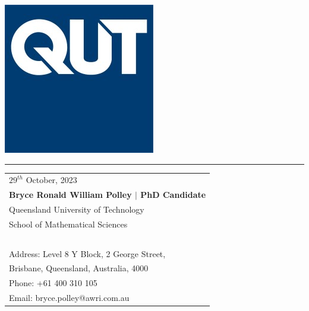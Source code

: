 \documentclass{article}
\begin{document}

\includegraphics[scale=0.5]{logo.jpg} %

\vspace{-1em} %

\rule{\linewidth}{1pt} %

\bigskip\bigskip %


\hfill
\begin{tabular}{l @{}}
	$29^{th}$ October, 2023\\ %
	\textbf{Bryce Ronald William Polley $|$ PhD Candidate}\\
	Queensland University of Technology \\
	School of Mathematical Sciences\\~\\
	Address: Level 8 Y Block, 2 George Street, \\
	Brisbane, Queensland, Australia, 4000\\
	Phone: +61 400 310 105 \\
	Email: bryce.polley@awri.com.au
\end{tabular}

\bigskip %

\end{document}

